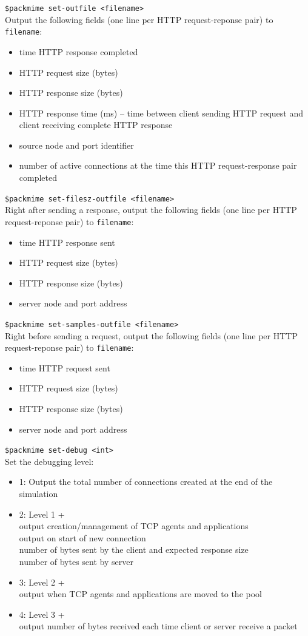 {\tt \$packmime set-outfile <filename>}\\
Output the following fields (one line per HTTP request-reponse pair)
to {\tt filename}:
\begin{itemize}
\item{time HTTP response completed}
\item{HTTP request size (bytes)}
\item{HTTP response size (bytes)}
\item{HTTP response time (ms) -- time between client sending HTTP
request and client receiving complete HTTP response} 
\item{source node and port identifier}
\item{number of active connections at the time this HTTP
request-response pair completed}
\end{itemize}

{\tt \$packmime set-filesz-outfile <filename>}\\
Right after sending a response, output the following fields (one line
per HTTP request-reponse pair) to {\tt filename}: 
\begin{itemize}
\item{time HTTP response sent}
\item{HTTP request size (bytes)}
\item{HTTP response size (bytes)}
\item{server node and port address}
\end{itemize}

{\tt \$packmime set-samples-outfile <filename>}\\
Right before sending a request, output the following fields (one line
per HTTP request-reponse pair) to {\tt filename}: 
\begin{itemize}
\item{time HTTP request sent}
\item{HTTP request size (bytes)}
\item{HTTP response size (bytes)}
\item{server node and port address}
\end{itemize}

{\tt \$packmime set-debug <int>}\\
Set the debugging level:
\begin{itemize}
\item{1: Output the total number of connections created at the end of
the simulation}
\item{2: Level 1 + \\
output creation/management of TCP agents and applications\\
output on start of new connection\\
number of bytes sent by the client and expected response size\\
number of bytes sent by server}
\item{3: Level 2 + \\
output when TCP agents and applications are moved to the pool}
\item{4: Level 3 + \\
output number of bytes received each time client or server receive a packet}
\end{itemize}



